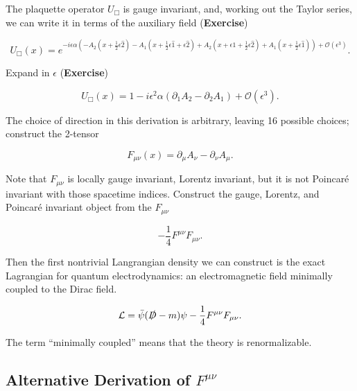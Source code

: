 \noindent The plaquette operator $U_\Box$ is gauge invariant, and, working out the Taylor series, we can write it in terms of the auxiliary field (\textbf{Exercise})

\begin{equation}
U_\Box (x)  = e^{-i \epsilon \alpha (-A_2 (x + \frac{1}{2} \epsilon \hat{2}) - A_1 (x + \frac{1}{2} \epsilon \hat{1} + \epsilon \hat{2}) + A_2 (x + \epsilon \hat{1} +\frac{1}{2} \epsilon \hat{2}) + A_1 (x + \frac{1}{2} \epsilon \hat{1})) + \mathcal{O} (\epsilon^3)}.
\end{equation}

\noindent Expand in $\epsilon$ (\textbf{Exercise})

\begin{equation}
U_\Box (x) = 1 - i \epsilon^2 \alpha (\partial_1 A_2 - \partial_2 A_1 ) + \mathcal{O} (\epsilon^3).
\end{equation}

\noindent The choice of direction in this derivation is arbitrary, leaving 16 possible choices; construct the 2-tensor

\begin{equation}
F_{\mu\nu} (x) = \partial_\mu A_\nu - \partial_\nu A_\mu.
\end{equation}

\noindent Note that $F_{\mu\nu}$ is locally gauge invariant, Lorentz invariant, but it is not Poincar\'e invariant with those spacetime indices. Construct the gauge, Lorentz, and Poincar\'e invariant object from the $F_{\mu\nu}$

\begin{equation}
-\frac{1}{4} F^{\mu\nu} F_{\mu\nu}.
\end{equation}

\noindent Then the first nontrivial Langrangian density we can construct is the exact Lagrangian for quantum electrodynamics: an electromagnetic field minimally coupled to the Dirac field.

\begin{equation}
\mathcal{L} = \bar{\psi} (\slashed{D} - m) \psi -\frac{1}{4} F^{\mu\nu} F_{\mu\nu}.
\end{equation}

\noindent The term ``minimally coupled'' means that the theory is renormalizable. \\

\subsection*{Alternative Derivation of $F^{\mu\nu}$}

